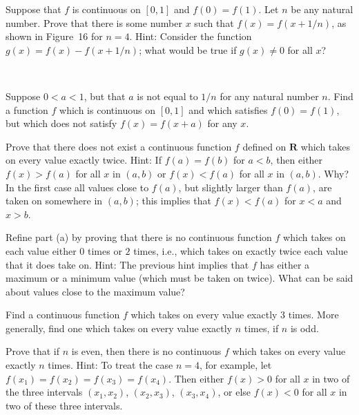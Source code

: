 \begin{letters}
\item Suppose that $f$ is continuous on $[0,1]$ and $f(0)=f(1)$. Let $n$ be any
natural number. Prove that there is some number $x$ such that
$f(x)=f(x+1/n)$, as shown in Figure~16 for $n=4$. Hint: Consider the function
$g(x)=f(x)-f(x+1/n)$; what would be true if $g(x)\neq 0$ for all $x$?
\begin{center}
\\[0.6em]
\end{center}
\item[\textbf{*(b)}] Suppose $0<a<1$, but that $a$ is not equal to $1/n$ for
any natural number $n$. Find a function $f$ which is continuous on $[0,1]$ and
which satisfies $f(0)=f(1)$, but which does not satisfy $f(x)=f(x+a)$ for any
$x$.
\end{letters}

\begin{letters}
\item Prove that there does not exist a continuous function $f$ defined on
$\mathbf{R}$ which takes on every value exactly twice. Hint: If $f(a)=f(b)$ for
$a<b$, then either $f(x)>f(a)$ for all $x$ in $(a,b)$ or $f(x)<f(a)$ for all
$x$ in $(a,b)$. Why? In the first case all values close to $f(a)$, but slightly
larger than $f(a)$, are taken on somewhere in $(a,b)$; this implies that
$f(x)<f(a)$ for $x<a$ and $x>b$.
\item Refine part (a) by proving that there is no continuous function $f$ which
takes on each value either $0$ times or $2$ times, i.e., which takes on exactly
twice each value that it does take on. Hint: The previous hint implies that $f$
has either a maximum or a minimum value (which must be taken on twice). What
can be said about values close to the maximum value?
\item Find a continuous function $f$ which takes on every value exactly $3$
times. More generally, find one which takes on every value exactly $n$ times,
if $n$ is odd.
\item Prove that if $n$ is even, then there is no continuous $f$ which takes on
every value exactly $n$ times. Hint: To treat the case $n=4$, for example, let
$f(x_1)=f(x_2)=f(x_3)=f(x_4)$. Then either $f(x)>0$ for all $x$ in two of the
three intervals $(x_1,x_2)$, $(x_2,x_3)$, $(x_3,x_4)$, or else $f(x)<0$ for all
$x$ in two of these three intervals.
\end{letters}
